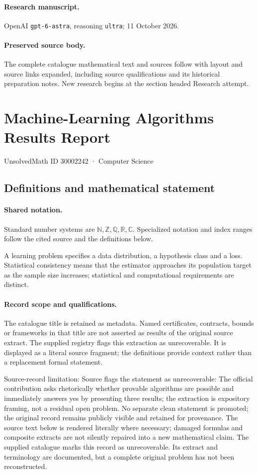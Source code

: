 \documentclass[11pt]{article}
\begin{document}
\paragraph{Research manuscript.} OpenAI \texttt{gpt-6-astra}, reasoning \texttt{ultra}; 11 October 2026.
\paragraph{Preserved source body.} The complete catalogue mathematical text and sources follow with layout and source links expanded, including source qualifications and its historical preparation notes. New research begins at the section headed Research attempt.

\section{Machine-Learning Algorithms Results Report}\label{30002242}
{\small UnsolvedMath ID 30002242 · Computer Science}
\subsection{Definitions and mathematical statement}

\paragraph{Shared notation.}Standard number systems are $\mathbb N,\mathbb Z,\mathbb Q,\mathbb R,\mathbb C$. Specialized notation and index ranges follow the cited source and the definitions below.


A learning problem specifies a data distribution, a hypothesis class and a loss. Statistical consistency means that the estimator approaches its population target as the sample size increases; statistical and computational requirements are distinct.
\paragraph{Record scope and qualifications.}
The catalogue title is retained as metadata. Named certificates, contracts, bounds or frameworks in that title are not asserted as results of the original source extract.
The supplied registry flags this extraction as unrecoverable. It is displayed as a literal source fragment; the definitions provide context rather than a replacement formal statement.

Source-record limitation: Source flags the statement as unrecoverable: The official contribution asks rhetorically whether provable algorithms are possible and immediately answers yes by presenting three results; the extraction is expository framing, not a residual open problem. No separate clean statement is promoted; the original record remains publicly visible and retained for provenance.
The source text below is rendered literally where necessary; damaged formulas and composite extracts are not silently repaired into a new mathematical claim.
The supplied catalogue marks this record as unrecoverable. Its extract and terminology are documented, but a complete original problem has not been reconstructed.
\end{document}
